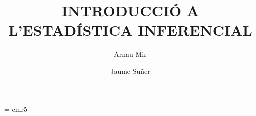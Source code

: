 \documentclass[11pt,a4paper]{book}
\makeatletter
\newcounter{problema}
\renewcommand\tableofcontents{%
    \if@twocolumn
      \@restonecoltrue\onecolumn
    \else
      \@restonecolfalse
    \fi
    \chapter*{\contentsname
        \@mkboth{%
           \contentsname}{\contentsname}}%
    \@starttoc{toc}%
    \if@restonecol\twocolumn\fi
    }
\renewcommand\listoffigures{%
    \if@twocolumn
      \@restonecoltrue\onecolumn
    \else
      \@restonecolfalse
    \fi
    \chapter*{\listfigurename
      \@mkboth{\listfigurename}%
              {\listfigurename}}%
    \@starttoc{lof}%
    \if@restonecol\twocolumn\fi
    }
\makeatother
\begin{document}
\font\fiverm = cmr5
%
%
%
\newcommand{\bblref}[1]{{\bf \ref{#1}}}
\newtheorem{proposition}{Proposici\'o}[chapter]
\newtheorem{defin}{Definici\'o}[chapter]
\setcounter{problema}{0}
\setcounter{cas}{0}
\newcommand{\e}{{\rm e}}
\newcommand{\EE}{{\rm E}}
\newcommand{\Var}{{\rm Var}}
\newcommand{\Cov}{{\rm Cov}}
\newcommand{\pp}[1]{p\left\{#1\right\}}
\renewcommand{\thecas}{\Roman{cas}}
\newcommand{\posacas}{\addtocounter{cas}{1}{\bf \thecas}}
\makeatletter
{}
\makeatother
\makeatletter
\def\etiqueta#1{\immediate\write\@auxout{\string
      \newlabel{#1}{{\thechapter .\theproblema}}}}
\makeatother
\newcommand{\text}[1]{\mbox{#1}}

\newenvironment{prob}
{\addtocounter{problema}{1}
\noindent
{\textbf{\thechapter.\theproblema.- }}}
{
\vspace{\baselineskip}}

\newlength\amplada
\setlength{\amplada}{\textwidth - 8mm}
\newenvironment{probres}[1]
{\addtocounter{problema}{1}
\noindent\shadowbox{
\parbox{\amplada}{
\noindent
{\textbf{\thechapter.\theproblema.- }}#1}}}
{
\vspace{\baselineskip}}

\newcommand{\prb}[1]{\addtocounter{problema}{1}
\noindent
{\textbf{\thechapter.\theproblema.- }#1}
\vspace{\baselineskip}
}
\newcommand{\prbr}[1]{\addtocounter{problema}{1}
\noindent\shadowbox{
\parbox{\textwidth}{
\noindent
{\textbf{\thechapter.\theproblema.- }#1}
}}
\vspace{\baselineskip}
}

\newcommand{\res}[1]{
\textbf{Resoluci\'o. }{\sf #1}
\vspace{\baselineskip}
}
\title{INTRODUCCI\'O A L'ESTAD\'ISTICA INFERENCIAL
}
\author{Arnau Mir\and
Jaume Su\~ner}
\maketitle

\mainmatter
\tableofcontents
\listoffigures















\nocite{*}


\printindex
\end{document}
